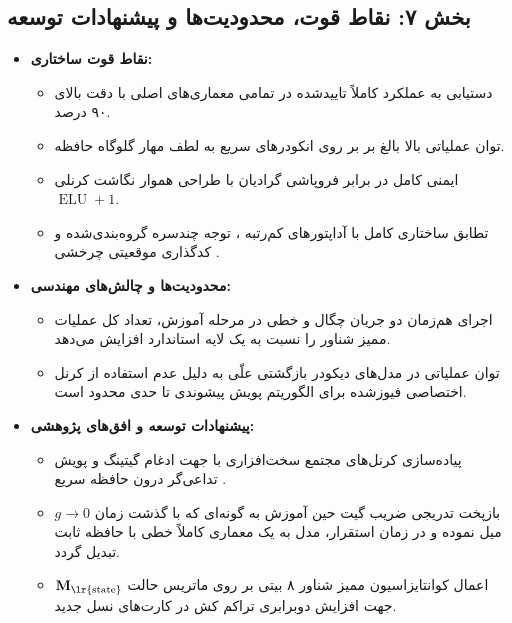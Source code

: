 \subsection*{بخش ۷: نقاط قوت، محدودیت‌ها و پیشنهادات توسعه }
\begin{itemize}
    \item \textbf{نقاط قوت ساختاری:}
    \begin{itemize}
        \item دستیابی به عملکرد کاملاً تاییدشده  در تمامی معماری‌های اصلی  با دقت بالای ۹۰ درصد.
        \item توان عملیاتی بالا بالغ بر  بر روی انکودرهای سریع به لطف مهار گلوگاه حافظه.
        \item ایمنی کامل در برابر فروپاشی گرادیان با طراحی هموار نگاشت کرنلی $\operatorname{ELU}+1$.
        \item تطابق ساختاری کامل با آداپتورهای کم‌رتبه ، توجه چندسره گروه‌بندی‌شده  و کدگذاری موقعیتی چرخشی .
    \end{itemize}
    \item \textbf{محدودیت‌ها و چالش‌های مهندسی:}
    \begin{itemize}
        \item اجرای هم‌زمان دو جریان چگال و خطی در مرحله آموزش، تعداد کل عملیات ممیز شناور  را نسبت به یک لایه استاندارد افزایش می‌دهد.
        \item توان عملیاتی در مدل‌های دیکودر بازگشتی علّی به دلیل عدم استفاده از کرنل اختصاصی فیوزشده  برای الگوریتم پویش پیشوندی تا حدی محدود است.
    \end{itemize}
    \item \textbf{پیشنهادات توسعه و افق‌های پژوهشی:}
    \begin{itemize}
        \item پیاده‌سازی کرنل‌های مجتمع سخت‌افزاری با  جهت ادغام گیتینگ و پویش تداعی‌گر درون حافظه سریع .
        \item بازپخت تدریجی ضریب گیت  حین آموزش به گونه‌ای که با گذشت زمان $g \to 0$ میل نموده و در زمان استقرار، مدل به یک معماری کاملاً خطی با حافظه ثابت تبدیل گردد.
        \item اعمال کوانتایزاسیون ممیز شناور ۸ بیتی  بر روی ماتریس حالت $\mathbf{M}_{\text{\lr{state}}}$ جهت افزایش دوبرابری تراکم کش در کارت‌های نسل جدید.
    \end{itemize}
\end{itemize}


